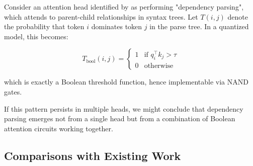 Consider an attention head identified by \cite{anthropic2023} as performing "dependency parsing", which attends to parent-child relationships in syntax trees. Let $T(i, j)$ denote the probability that token $i$ dominates token $j$ in the parse tree. In a quantized model, this becomes:






$$






T_{\text{bool}}(i,j) = 






\begin{cases}






1 & \text{if } q_i^\top k_j > \tau \\






0 & \text{otherwise}






\end{cases}






$$






which is exactly a Boolean threshold function, hence implementable via NAND gates.













If this pattern persists in multiple heads, we might conclude that dependency parsing emerges not from a single head but from a combination of Boolean attention circuits working together.













\subsection{Comparisons with Existing Work}













